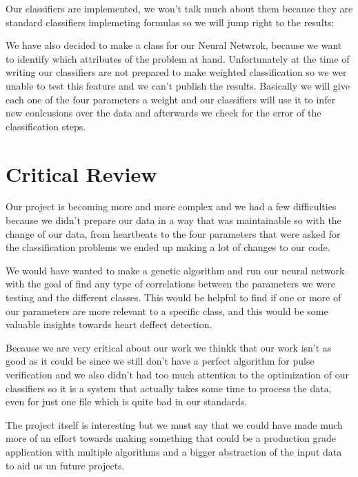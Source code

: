 \documentclass[conference]{IEEEtran}
\begin{document}
\begin{itemize}
\begin{itemize}
Our classifiers are implemented, we won't talk much about them because they are
standard classifiers implemeting formulas so we will jump right to the results:

We have also decided to make a class for our Neural Netwrok, because we want to
identify which attributes of the problem at hand. Unfortunately at the time of
writing our classifiers are not prepared to make weighted classification so we
wer unable to test this feature and we can't publish the results.
Basically we will give each one of the four parameters a weight and our
classifiers will use it to infer new conlcusions over the data and afterwards
we check for the error of the classification steps.

\section{Critical Review}
Our project is becoming more and more complex and we had a few difficulties
because we didn't prepare our data in a way that was maintainable so with the
change of our data, from heartbeats to the four parameters that were asked for
the classification problems we ended up making a lot of changes to our code.

We would have wanted to make a genetic algorithm and run our neural network with
the goal of find any type of correlations between the parameters we were testing
and the different classes. This would be helpful to find if one or more of our
parameters are more relevant to a specific class, and this would be some
valuable insights towards heart deffect detection.

Because we are very critical about our work we thinkk that our work isn't as
good as it could be since we still don't have a perfect algorithm for pulse
verification and we also didn't had too much attention to the optimization of
our classifiers so it is a system that actually takes some time to process the
data, even for just one file which is quite bad in our standards.

The project itself is interesting but we must say that we could have made much
more of an effort towards making something that could be a production grade
application with multiple algorithms and a bigger abstraction of the input data
to aid us un future projects.


\end{itemize}
\end{itemize}
\end{document}
